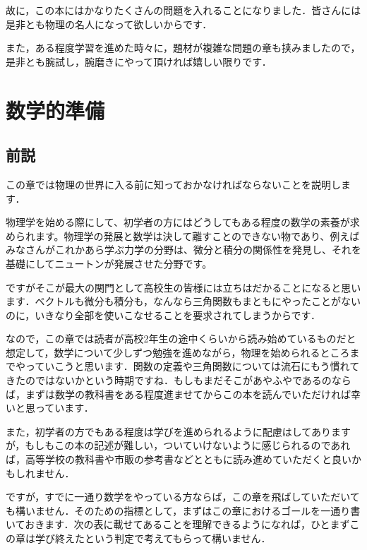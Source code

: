 \documentclass[
  b4paperpaper,
  xelatex,ja=standard]{bxjsbook}
\begin{document}
故に，この本にはかなりたくさんの問題を入れることになりました．皆さんには是非とも物理の名人になって欲しいからです．

また，ある程度学習を進めた時々に，題材が複雑な問題の章も挟みましたので，是非とも腕試し，腕磨きにやって頂ければ嬉しい限りです．


\hypertarget{ux6570ux5b66ux7684ux6e96ux5099}{%
\chapter{数学的準備}\label{ux6570ux5b66ux7684ux6e96ux5099}}

\hypertarget{ux524dux8aac}{%
\section{前説}\label{ux524dux8aac}}

この章では物理の世界に入る前に知っておかなければならないことを説明します．

物理学を始める際にして、初学者の方にはどうしてもある程度の数学の素養が求められます。物理学の発展と数学は決して離すことのできない物であり、例えばみなさんがこれかあら学ぶ力学の分野は、微分と積分の関係性を発見し、それを基礎にしてニュートンが発展させた分野です。

ですがそこが最大の関門として高校生の皆様には立ちはだかることになると思います．ベクトルも微分も積分も，なんなら三角関数もまともにやったことがないのに，いきなり全部を使いこなせることを要求されてしまうからです．

なので，この章では読者が高校2年生の途中くらいから読み始めているものだと想定して，数学について少しずつ勉強を進めながら，物理を始められるところまでやっていこうと思います．関数の定義や三角関数については流石にもう慣れてきたのではないかという時期ですね．もしもまだそこがあやふやであるのならば，まずは数学の教科書をある程度進ませてからこの本を読んでいただければ幸いと思っています．

また，初学者の方でもある程度は学びを進められるように配慮はしてありますが，もしもこの本の記述が難しい，ついていけないように感じられるのであれば，高等学校の教科書や市販の参考書などとともに読み進めていただくと良いかもしれません．

ですが，すでに一通り数学をやっている方ならば，この章を飛ばしていただいても構いません．そのための指標として，まずはこの章におけるゴールを一通り書いておきます．次の表に載せてあることを理解できるようになれば，ひとまずこの章は学び終えたという判定で考えてもらって構いません．
\end{document}
